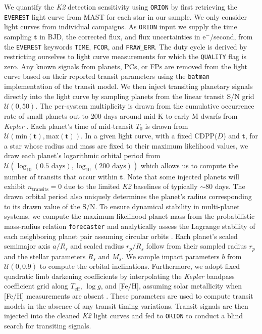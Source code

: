 \documentclass[twocolumn]{emulateapj}
\newcommand{\kepler}[1]{\emph{Kepler}#1}
\newcommand{\ktwo}[1]{\emph{K2}#1}
\newcommand{\teff}[1]{$T_{\text{eff}}$#1}
\newcommand{\logg}[1]{$\log{g}$#1}
\begin{document}
We quantify the \ktwo{} detection sensitivity using \texttt{ORION} by first retrieving the \texttt{EVEREST} light
curve from MAST for each star in our sample. We only consider light curves from individual campaigns. As
\texttt{ORION} input we supply the time sampling $\mathbf{t}$ in BJD, the corrected flux, and flux uncertainties
in e$^-$/second, from the \texttt{EVEREST} keywords \texttt{TIME}, \texttt{FCOR}, and \texttt{FRAW\_ERR}.
The duty cycle is derived by restricting ourselves to light curve
measurements for which the \texttt{QUALITY} flag is zero.
Any known signals from planets, PCs, or FPs are removed from the light
curve based on their reported transit parameters using the \texttt{batman} \citep{kreidberg15} implementation of
the \cite{mandel02} transit model. We then inject transiting planetary signals directly into the light curve
by sampling planets from the linear transit S/N grid $\mathcal{U}(0,50)$. The per-system
multiplicity is drawn
from the cumulative occurrence rate of small planets out to 200 days around
mid-K to early M dwarfs from \kepler{} \citep[$2.5 \pm 0.2$;][]{dressing15a}.
Each planet's time of mid-transit $T_0$ is
drawn from $\mathcal{U}(\text{min}(\mathbf{t}),\text{max}(\mathbf{t}))$.
In a given light curve, with a fixed CDPP($D$) and $\mathbf{t}$, for a star
whose radius and mass are fixed to their maximum likelihood values, we
draw each planet's logarithmic orbital period from $\mathcal{U}(\log_{10}(0.5\text{ days}),\log_{10}(200\text{ days}))$
which allows us to compute the number of
transits that occur within $\mathbf{t}$. Note that some injected planets
will exhibit $n_{\text{transits}}=0$ due to the limited \ktwo{} baselines of typically $\sim 80$ days.
The drawn orbital period also uniquely determines the planet's radius corresponding to its drawn value of the S/N.
To ensure dynamical stability in multi-planet
systems, we compute the maximum likelihood planet mass from the probabilistic mass-radius relation \texttt{forecaster}
\citep{chen17} and analytically assess the Lagrange stability of each neighboring planet pair assuming circular
orbits \citep{barnes06}. Each planet's scaled semimajor axis $a/R_s$ and scaled radius $r_p/R_s$ follow from
their sampled radius $r_p$ and the stellar parameters $R_s$ and $M_s$. We sample impact parameters $b$ from
$\mathcal{U}(0,0.9)$ to compute the orbital inclinations. Furthermore, we adopt fixed quadratic limb darkening
coefficients by interpolating the \kepler{} bandpass coefficient grid along \teff{,} \logg{,} and [Fe/H], assuming
solar metallicity when [Fe/H] measurements are absent \citep{claret12}.
These parameters are used to compute transit models in the absence of any transit timing variations.
Transit signals are then injected into the cleaned \ktwo{} light curves and fed to
\texttt{ORION} to conduct a blind search for transiting signals.
\end{document}
